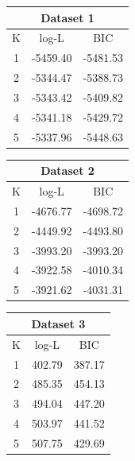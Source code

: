 \documentclass[11pt,psfig]{article}
\begin{document}
\begin{table}[H]
  \centering
  \begin{tabular}{|c|c|c|}
    \hline
    \multicolumn{3}{|c|}{Dataset 1} \\\hline
    K & log-L & BIC \\\hline
    1 & -5459.40 & -5481.53 \\
		2 & -5344.47 & -5388.73 \\
		3 & -5343.42 & -5409.82 \\
		4 & -5341.18 & -5429.72 \\
    5 & -5337.96 & -5448.63 \\\hline
  \end{tabular}
  \begin{tabular}{|c|c|c|}
    \hline
    \multicolumn{3}{|c|}{Dataset 2} \\\hline
    K & log-L & BIC \\\hline
    1 & -4676.77 & -4698.72 \\
		2 & -4449.92 & -4493.80 \\
		3 & -3993.20 & -3993.20 \\
		4 & -3922.58 & -4010.34 \\
    5 & -3921.62 & -4031.31 \\\hline
  \end{tabular}
  \begin{tabular}{|c|c|c|}
    \hline
    \multicolumn{3}{|c|}{Dataset 3} \\\hline
    K & log-L & BIC \\\hline
    1 & 402.79 & 387.17 \\
		2 & 485.35 & 454.13 \\
		3 & 494.04 & 447.20 \\
		4 & 503.97 & 441.52 \\
    5 & 507.75 & 429.69 \\\hline
  \end{tabular}
\end{table}
\end{document}
